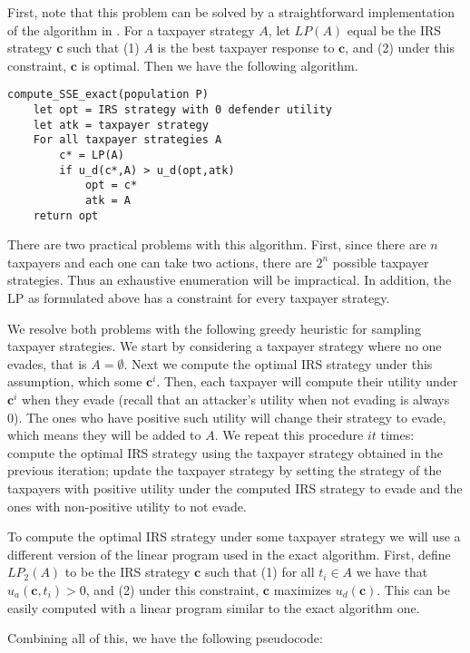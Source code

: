 \documentclass[paper=letter, fontsize=11pt]{article}
\begin{document}
First, note that this problem can be solved by a straightforward
implementation of the algorithm in \cite{conitzer2006computing}. For a
taxpayer strategy $A$, let $LP(A)$ equal be the IRS strategy $\bm{c}$
such that (1) $A$ is the best taxpayer response to $\bm{c}$, and (2)
under this constraint, $\bm{c}$ is optimal. Then we have the following
algorithm.

\begin{verbatim}
compute_SSE_exact(population P)
    let opt = IRS strategy with 0 defender utility
    let atk = taxpayer strategy
    For all taxpayer strategies A
        c* = LP(A)
        if u_d(c*,A) > u_d(opt,atk)
            opt = c*
            atk = A
    return opt
\end{verbatim}

There are two practical problems with this algorithm. First, since
there are $n$ taxpayers and each one can take two actions, there are
$2^n$ possible taxpayer strategies. Thus an exhaustive enumeration
will be impractical. In addition, the LP as formulated above has a
constraint for every taxpayer strategy.

We resolve both problems with the following greedy heuristic for
sampling taxpayer strategies. We start by considering a taxpayer
strategy where no one evades, that is $A = \emptyset$. Next we compute
the optimal IRS strategy under this assumption, which some
$\bm{c}^i$. Then, each taxpayer will compute their utility under
$\bm{c}^i$ when they evade (recall that an attacker's utility when not
evading is always 0). The ones who have positive such utility will
change their strategy to evade, which means they will be added to
$A$. We repeat this procedure $it$ times: compute the optimal IRS
strategy using the taxpayer strategy obtained in the previous
iteration; update the taxpayer strategy by setting the strategy of the
taxpayers with positive utility under the computed IRS strategy to
evade and the ones with non-positive utility to not evade.

To compute the optimal IRS strategy under some taxpayer strategy we
will use a different version of the linear program used in the exact
algorithm. First, define $LP_2(A)$ to be the IRS strategy $\bm{c}$
such that (1) for all $t_i \in A$ we have that $u_a(\bm{c}, t_i) > 0$,
and (2) under this constraint, $\bm{c}$ maximizes $u_d(\bm{c})$. This
can be easily computed with a linear program similar to the exact
algorithm one.

Combining all of this, we have the following pseudocode:
\end{document}
